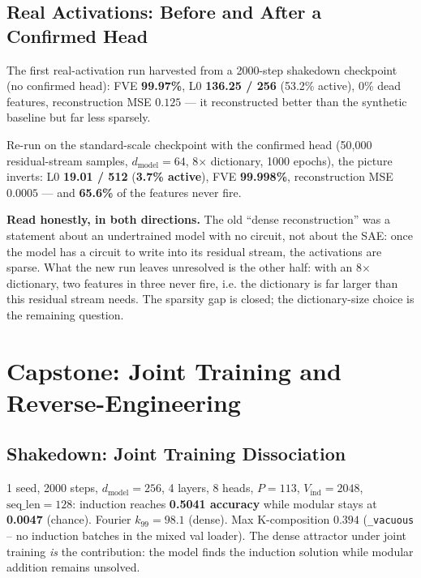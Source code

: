 \documentclass[11pt]{article}
\begin{document}
\subsection{Real Activations: Before and After a Confirmed Head}
The first real-activation run harvested from a 2000-step shakedown checkpoint
(no confirmed head): FVE \textbf{99.97\%}, L0 \textbf{136.25 / 256}
(53.2\% active), 0\% dead features, reconstruction MSE $0.125$ --- it
reconstructed better than the synthetic baseline but far less sparsely.

Re-run on the standard-scale checkpoint with the confirmed head (50{,}000
residual-stream samples, $d_\text{model}=64$, 8$\times$ dictionary, 1000
epochs), the picture inverts: L0 \textbf{19.01 / 512} (\textbf{3.7\% active}),
FVE \textbf{99.998\%}, reconstruction MSE $0.0005$ --- and \textbf{65.6\%} of
the features never fire.

\textbf{Read honestly, in both directions.} The old ``dense reconstruction''
was a statement about an undertrained model with no circuit, not about the
SAE: once the model has a circuit to write into its residual stream, the
activations are sparse. What the new run leaves unresolved is the other
half: with an 8$\times$ dictionary, two features in three never fire, i.e.
the dictionary is far larger than this residual stream needs. The sparsity
gap is closed; the dictionary-size choice is the remaining question.

\section{Capstone: Joint Training and Reverse-Engineering}
\label{sec:capstone}

\subsection{Shakedown: Joint Training Dissociation}
1 seed, 2000 steps, $d_\text{model}=256$, 4 layers, 8 heads, $P=113$,
$V_\text{ind}=2048$, $\text{seq\_len}=128$: induction reaches
\textbf{0.5041 accuracy} while modular stays at \textbf{0.0047} (chance).
Fourier $k_{99} = 98.1$ (dense). Max K-composition $0.394$ (\texttt{\_vacuous}
-- no induction batches in the mixed val loader). The dense attractor
under joint training \emph{is} the contribution: the model finds the
induction solution while modular addition remains unsolved.
\end{document}
